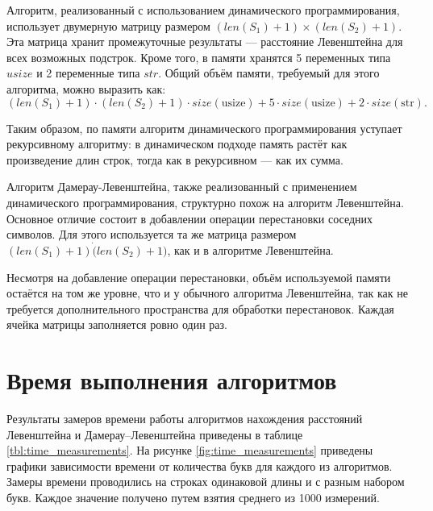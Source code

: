 Алгоритм, реализованный с использованием динамического программирования, использует двумерную матрицу размером $(len(S_{1}) + 1) \times (len(S_{2}) + 1)$. Эта матрица хранит промежуточные результаты — расстояние Левенштейна для всех возможных подстрок. Кроме того, в памяти хранятся 5 переменных типа $usize$ и 2 переменные типа $str$. Общий объём памяти, требуемый для этого алгоритма, можно выразить как:
\begin{equation}
    (len(S_{1}) + 1) \cdot (len(S_{2}) + 1) \cdot size(\text{usize}) + 5 \cdot size(\text{usize}) + 2 \cdot size(\text{str}).
\end{equation}

Таким образом, по памяти алгоритм динамического программирования уступает рекурсивному алгоритму: в динамическом подходе память растёт как произведение длин строк, тогда как в рекурсивном — как их сумма.

Алгоритм Дамерау-Левенштейна, также реализованный с применением динамического программирования, структурно похож на алгоритм Левенштейна. Основное отличие состоит в добавлении операции перестановки соседних символов. Для этого используется та же матрица размером $(len(S_{1}) + 1) \dot (len(S_{2}) + 1)$, как и в алгоритме Левенштейна.

Несмотря на добавление операции перестановки, объём используемой памяти остаётся на том же уровне, что и у обычного алгоритма Левенштейна, так как не требуется дополнительного пространства для обработки перестановок. Каждая ячейка матрицы заполняется ровно один раз.

\clearpage

\section{Время выполнения алгоритмов}
Результаты замеров времени работы алгоритмов нахождения расстояний Левенштейна и Дамерау–Левенштейна приведены в таблице \ref{tbl:time_measurements}. На рисунке \ref{fig:time_measurements} приведены графики зависимости времени от количества букв для каждого из алгоритмов. Замеры времени проводились на строках одинаковой длины и с разным набором букв. Каждое значение получено путем взятия среднего из 1000 измерений.

